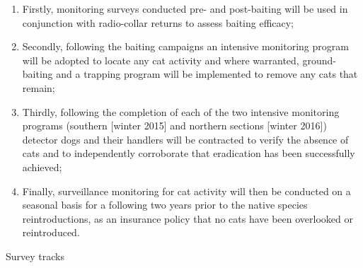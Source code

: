 \documentclass[version=last,
    paper=a4,                               %
    10pt,                                   %
    dvipsnames,
    oneside,                              %
    headings=openany,                       %
    open=any,
    BCOR=7mm,                               %
    DIV=15,     %
]{scrbook}
\begin{document}
\begin{enumerate}
\itemsep1pt\parskip0pt
\item
  Firstly, monitoring surveys conducted pre- and post-baiting will be
  used in conjunction with radio-collar returns to assess baiting
  efficacy;
\item
  Secondly, following the baiting campaigns an intensive monitoring
  program will be adopted to locate any cat activity and where
  warranted, ground-baiting and a trapping program will be implemented
  to remove any cats that remain;
\item
  Thirdly, following the completion of each of the two intensive
  monitoring programs (southern {[}winter 2015{]} and northern sections
  {[}winter 2016{]}) detector dogs and their handlers will be contracted
  to verify the absence of cats and to independently corroborate that
  eradication has been successfully achieved;
\item
  Finally, surveillance monitoring for cat activity will then be
  conducted on a seasonal basis for a following two years prior to the
  native species reintroductions, as an insurance policy that no cats
  have been overlooked or reintroduced.
\end{enumerate}

Survey tracks
\end{document}
